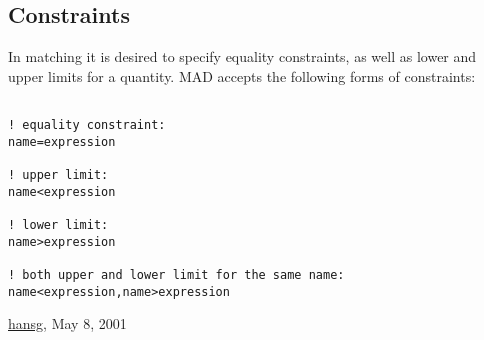 




\subsection{Constraints}
 In matching it is desired to specify equality constraints, as well as lower and upper limits for a quantity. MAD accepts the following forms of constraints: 
\begin{verbatim}

! equality constraint:
name=expression

! upper limit:
name<expression

! lower limit:
name>expression

! both upper and lower limit for the same name:
name<expression,name>expression
\end{verbatim}\href{http://www.cern.ch/Hans.Grote/hansg_sign.html}{hansg}, May 8, 2001 

